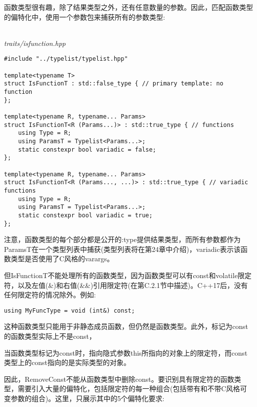 
函数类型很有趣，除了结果类型之外，还有任意数量的参数。因此，匹配函数类型的偏特化中，使用一个参数包来捕获所有的参数类型:

\hspace*{\fill} \\ %
\noindent
\textit{traits/isfunction.hpp}
\begin{lstlisting}[style=styleCXX]
#include "../typelist/typelist.hpp"

template<typename T>
struct IsFunctionT : std::false_type { // primary template: no function
};

template<typename R, typename... Params>
struct IsFunctionT<R (Params...)> : std::true_type { // functions
	using Type = R;
	using ParamsT = Typelist<Params...>;
	static constexpr bool variadic = false;
};

template<typename R, typename... Params>
struct IsFunctionT<R (Params..., ...)> : std::true_type { // variadic functions
	using Type = R;
	using ParamsT = Typelist<Params...>;
	static constexpr bool variadic = true;
};
\end{lstlisting}

注意，函数类型的每个部分都是公开的:type提供结果类型，而所有参数都作为ParamsT在一个类型列表中捕获(类型列表将在第24章中介绍)，variadic表示该函数类型是否使用了C风格的varargs。

但IsFunctionT不能处理所有的函数类型，因为函数类型可以有const和volatile限定符，以及左值(\&)和右值(\&\&)引用限定符(在第C.2.1节中描述)。C++17后，没有任何限定符的情况除外。例如:

\begin{lstlisting}[style=styleCXX]
using MyFuncType = void (int&) const;
\end{lstlisting}

这种函数类型只能用于非静态成员函数，但仍然是函数类型。此外，标记为const的函数类型实际上不是const，

\begin{tcolorbox}[colback=webgreen!5!white,colframe=webgreen!75!black]
\hspace*{0.75cm}当函数类型标记为const时，指向隐式参数this所指向的对象上的限定符，而const类型上的const指向的是实际类型的对象。
\end{tcolorbox}

因此，RemoveConst不能从函数类型中删除const。要识别具有限定符的函数类型，需要引入大量的偏特化，包括限定符的每一种组合(包括带有和不带C风格可变参数的组合)。这里，只展示其中的5个偏特化要求:

